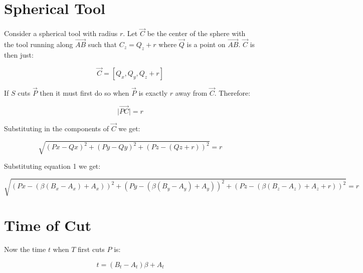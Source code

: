 \documentclass{article}
\newcommand{\norm}[1]{\lvert #1 \rvert}
\begin{document}
\section{Spherical Tool}
Consider a spherical tool with radius $r$.  Let $\vec{C}$ be the center of the
sphere with the tool running along $\vec{AB}$ such that $C_z = Q_z + r$ where
$\vec{Q}$ is a point on $\vec{AB}$.  $\vec{C}$ is then just:

\begin{equation*}
\vec{C} = [Q_x, Q_y, Q_z+r]
\end{equation*}

If $S$ cuts $\vec{P}$ then it must first do so when $\vec{P}$ is exactly $r$
away from $\vec{C}$.  Therefore:

\begin{equation*}
\norm{\vec{PC}} = r
\end{equation*}

Substituting in the components of $\vec{C}$ we get:

\begin{equation}
\sqrt{(Px-Qx)^2 + (Py-Qy)^2 + (Pz-(Qz+r))^2} = r
\end{equation}

Substituting equation 1 we get:

\begin{equation}
\sqrt{
  (Px-(\beta (B_x-A_x)+A_x))^2 +
  (Py-(\beta (B_y-A_y)+A_y))^2 +
  (Pz-(\beta (B_z-A_z)+A_z+r))^2} = r
\end{equation}

\section{Time of Cut}
Now the time $t$ when $T$ first cuts $P$ is:

\begin{equation}
t = (B_t - A_t) \beta + A_t
\end{equation}
\end{document}
